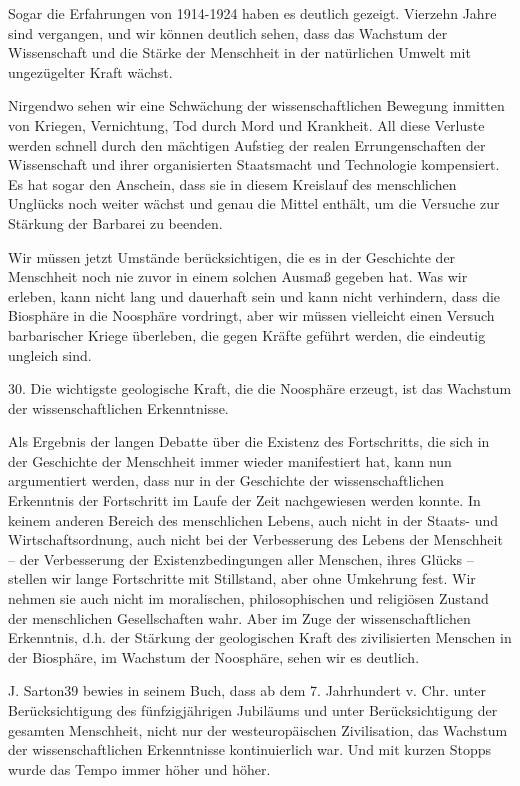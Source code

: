 \documentclass[11pt,a4paper]{book}
\begin{document}
Sogar die Erfahrungen von 1914-1924 haben es deutlich gezeigt. Vierzehn Jahre sind vergangen, und wir können deutlich sehen, dass das Wachstum der Wissenschaft und die Stärke der Menschheit in der natürlichen Umwelt mit ungezügelter Kraft wächst. 

Nirgendwo sehen wir eine Schwächung der wissenschaftlichen Bewegung inmitten von Kriegen, Vernichtung, Tod durch Mord und Krankheit. All diese Verluste werden schnell durch den mächtigen Aufstieg der realen Errungenschaften der Wissenschaft und ihrer organisierten Staatsmacht und Technologie kompensiert. Es hat sogar den Anschein, dass sie in diesem Kreislauf des menschlichen Unglücks noch weiter wächst und genau die Mittel enthält, um die Versuche zur Stärkung der Barbarei zu beenden. 

Wir müssen jetzt Umstände berücksichtigen, die es in der Geschichte der Menschheit noch nie zuvor in einem solchen Ausmaß gegeben hat. Was wir erleben, kann nicht lang und dauerhaft sein und kann nicht verhindern, dass die Biosphäre in die Noosphäre vordringt, aber wir müssen vielleicht einen Versuch barbarischer Kriege überleben, die gegen Kräfte geführt werden, die eindeutig ungleich sind. 

30. Die wichtigste geologische Kraft, die die Noosphäre erzeugt, ist das Wachstum der wissenschaftlichen Erkenntnisse. 

Als Ergebnis der langen Debatte über die Existenz des Fortschritts, die sich in der Geschichte der Menschheit immer wieder manifestiert hat, kann nun argumentiert werden, dass nur in der Geschichte der wissenschaftlichen Erkenntnis der Fortschritt im Laufe der Zeit nachgewiesen werden konnte. In keinem anderen Bereich des menschlichen Lebens, auch nicht in der Staats- und Wirtschaftsordnung, auch nicht bei der Verbesserung des Lebens der Menschheit -- der Verbesserung der Existenzbedingungen aller Menschen, ihres Glücks -- stellen wir lange Fortschritte mit Stillstand, aber ohne Umkehrung fest. Wir nehmen sie auch nicht im moralischen, philosophischen und religiösen Zustand der menschlichen Gesellschaften wahr. Aber im Zuge der wissenschaftlichen Erkenntnis, d.h. der Stärkung der geologischen Kraft des zivilisierten Menschen in der Biosphäre, im Wachstum der Noosphäre, sehen wir es deutlich. 

J. Sarton39 bewies in seinem Buch, dass ab dem 7. Jahrhundert v. Chr. unter Berücksichtigung des fünfzigjährigen Jubiläums und unter Berücksichtigung der gesamten Menschheit, nicht nur der westeuropäischen Zivilisation, das Wachstum der wissenschaftlichen Erkenntnisse kontinuierlich war. Und mit kurzen Stopps wurde das Tempo immer höher und höher. 
\end{document}
